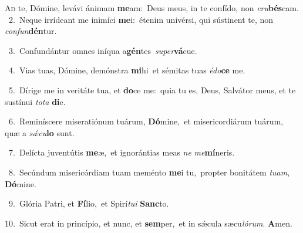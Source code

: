 \lettrine{\initial\textcolor{\initialcolor}{A}}{d} te, Dómine, levávi ánimam \textbf{me}\-am:~\star Deus meus, in te confído, non \textit{e}\-\textit{ru}\textbf{bés}cam.\\
{\numbfont\textcolor{\numbcolor}{~2.}}~Neque irrídeant me inimíci \textbf{me}\-i:~\star étenim univérsi, qui sústinent te, non \textit{con}\-\textit{fun}\textbf{dén}tur.\par
{\numbfont\textcolor{\numbcolor}{~3.}}~Confundántur omnes iníqua a\-\textbf{gén}\-tes~\star \textit{su}\-\textit{per}\textbf{vá}cue.\par
{\numbfont\textcolor{\numbcolor}{~4.}}~Vias tuas, Dómine, demónstra \textbf{mi}\-hi~\star et sémitas tuas \textit{é}\-\textit{do}\textbf{ce} me.\par
{\numbfont\textcolor{\numbcolor}{~5.}}~Dírige me in veritáte tua, et \textbf{do}\-ce me:~\star quia tu es, Deus, Salvátor meus, et te sustínui \textit{to}\-\textit{ta} \textbf{di}\-e.\par
{\numbfont\textcolor{\numbcolor}{~6.}}~Reminíscere miseratiónum tuárum, \textbf{Dó}\-mine,~\star et misericordiárum tuárum, quæ a \textit{sǽ}\-\textit{cu}\textbf{lo} sunt.\par
{\numbfont\textcolor{\numbcolor}{~7.}}~Delícta juventútis \textbf{me}\-æ,~\star et ignorántias meas \textit{ne} \textit{me}\-\textbf{mí}neris.\par
{\numbfont\textcolor{\numbcolor}{~8.}}~Secúndum misericórdiam tuam meménto \textbf{me}\-i tu,~\star propter bonitátem \textit{tu}\-\textit{am}, \textbf{Dó}\-mine.\par
{\numbfont\textcolor{\numbcolor}{~9.}}~Glória Patri, et \textbf{Fí}\-lio,~\star et Spirí\-\textit{tu}\-\textit{i} \textbf{Sanc}\-to.\par
{\numbfont\textcolor{\numbcolor}{10.}}~Sicut erat in princípio, et nunc, et \textbf{sem}\-per,~\star et in sǽcula sæcu\-\textit{ló}\-\textit{rum}. \textbf{A}\-men.\par
